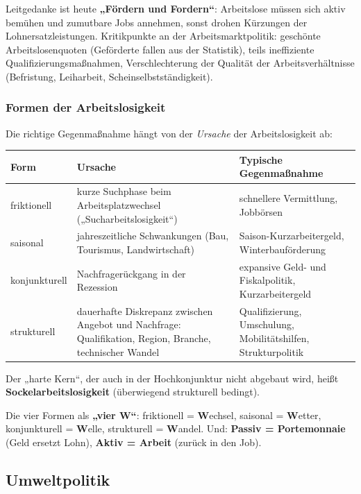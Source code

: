 \documentclass[11pt, a4paper]{article}
\begin{document}
Leitgedanke ist heute \textbf{„Fördern und Fordern``}: Arbeitslose müssen sich aktiv
bemühen und zumutbare Jobs annehmen, sonst drohen Kürzungen der Lohnersatzleistungen.
Kritikpunkte an der Arbeitsmarktpolitik: geschönte Arbeitslosenquoten (Geförderte fallen
aus der Statistik), teils ineffiziente Qualifizierungsmaßnahmen, Verschlechterung der
Qualität der Arbeitsverhältnisse (Befristung, Leiharbeit, Scheinselbstständigkeit).

\subsubsection{Formen der Arbeitslosigkeit}

Die richtige Gegenmaßnahme hängt von der \emph{Ursache} der Arbeitslosigkeit ab:

\begin{center}
\begin{tabular}{p{3.0cm} p{6.0cm} p{4.6cm}}
\toprule
\rowcolor{bfwTabHead}\textbf{Form} & \textbf{Ursache} & \textbf{Typische Gegenmaßnahme}\\
\midrule
friktionell & kurze Suchphase beim Arbeitsplatzwechsel („Sucharbeitslosigkeit``) & schnellere Vermittlung, Jobbörsen\\
saisonal & jahreszeitliche Schwankungen (Bau, Tourismus, Landwirtschaft) & Saison-Kurzarbeitergeld, Winterbauförderung\\
konjunkturell & Nachfragerückgang in der Rezession & expansive Geld- und Fiskalpolitik, Kurzarbeitergeld\\
strukturell & dauerhafte Diskrepanz zwischen Angebot und Nachfrage: Qualifikation, Region, Branche, technischer Wandel & Qualifizierung, Umschulung, Mobilitätshilfen, Strukturpolitik\\
\bottomrule
\end{tabular}
\end{center}

Der „harte Kern``, der auch in der Hochkonjunktur nicht abgebaut wird, heißt
\textbf{Sockelarbeitslosigkeit} (überwiegend strukturell bedingt).

\begin{eselsbruecke}
Die vier Formen als \textbf{„vier W``}: friktionell = \textbf{W}echsel, saisonal =
\textbf{W}etter, konjunkturell = \textbf{W}elle, strukturell = \textbf{W}andel.
Und: \textbf{Passiv = Portemonnaie} (Geld ersetzt Lohn), \textbf{Aktiv = Arbeit}
(zurück in den Job).
\end{eselsbruecke}

\subsection{Umweltpolitik}
\end{document}
